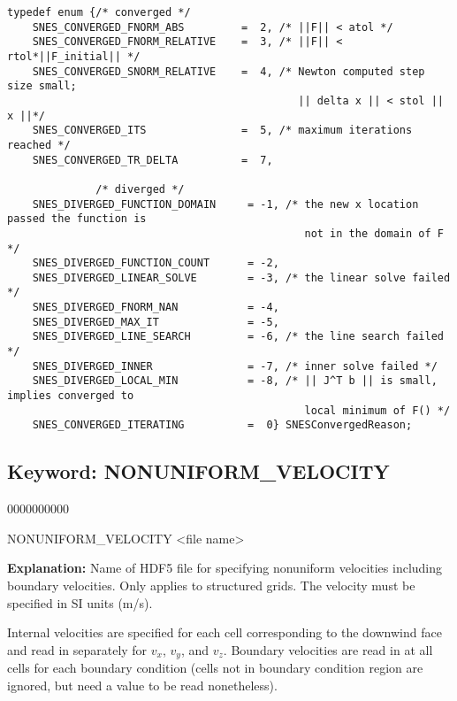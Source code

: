 \scriptsize
\begin{Verbatim}
typedef enum {/* converged */
    SNES_CONVERGED_FNORM_ABS         =  2, /* ||F|| < atol */
    SNES_CONVERGED_FNORM_RELATIVE    =  3, /* ||F|| < rtol*||F_initial|| */
    SNES_CONVERGED_SNORM_RELATIVE    =  4, /* Newton computed step size small; 
                                              || delta x || < stol || x ||*/
    SNES_CONVERGED_ITS               =  5, /* maximum iterations reached */
    SNES_CONVERGED_TR_DELTA          =  7,
    
              /* diverged */
    SNES_DIVERGED_FUNCTION_DOMAIN     = -1, /* the new x location passed the function is 
                                               not in the domain of F */
    SNES_DIVERGED_FUNCTION_COUNT      = -2,
    SNES_DIVERGED_LINEAR_SOLVE        = -3, /* the linear solve failed */
    SNES_DIVERGED_FNORM_NAN           = -4,
    SNES_DIVERGED_MAX_IT              = -5,
    SNES_DIVERGED_LINE_SEARCH         = -6, /* the line search failed */
    SNES_DIVERGED_INNER               = -7, /* inner solve failed */
    SNES_DIVERGED_LOCAL_MIN           = -8, /* || J^T b || is small, implies converged to 
                                               local minimum of F() */
    SNES_CONVERGED_ITERATING          =  0} SNESConvergedReason;
\end{Verbatim}
\normalsize


\hyperlink{target_key}{\return}


\newpage
\protect\hypertarget{target_nonuniform_vel}{}

\subsection{Keyword: NONUNIFORM\_VELOCITY}
\begin{deflist}{0000000000}
\item[NONUNIFORM\_VELOCITY] <file name>
\end{deflist}

{\bf Explanation:} Name of HDF5 file for specifying nonuniform velocities including boundary velocities. Only applies to structured grids. The velocity must be specified in SI units (m/s).

Internal velocities are specified for each cell corresponding to the downwind face and read in separately for $v_x$, $v_y$, and $v_z$.
Boundary velocities are read in at all cells for each boundary condition (cells not in boundary condition region are ignored, but need a value to be read nonetheless).  

